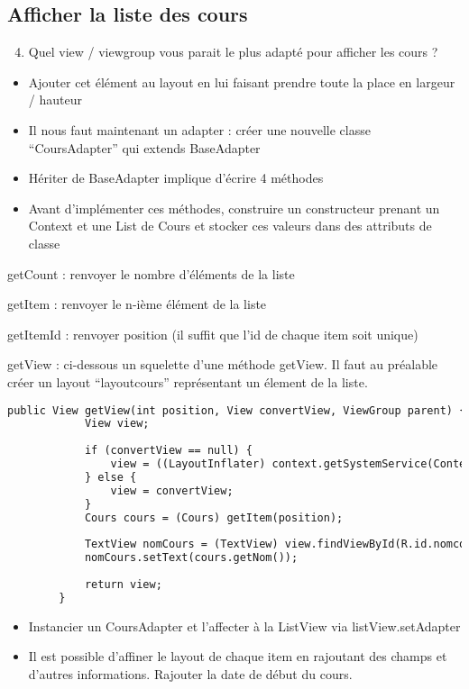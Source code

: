 \documentclass{article}
\begin{document}
\subsection{Afficher la liste des cours}
\begin{enumerate}
 \setcounter{enumi}{3}
\item Quel view / viewgroup vous parait le plus adapté pour afficher les cours ?
\end{enumerate}
\begin{itemize} 
  \item Ajouter cet élément au layout en lui faisant prendre toute la place en
  largeur / hauteur
  \item Il nous faut maintenant un adapter : créer une nouvelle classe
  ``CoursAdapter'' qui extends BaseAdapter
  \item Hériter de BaseAdapter implique d'écrire 4 méthodes
  \item Avant d'implémenter ces méthodes, construire un constructeur prenant un
  Context et une List de Cours et stocker ces valeurs dans des attributs de
  classe
 \end{itemize}
 \begin{description}
   \item getCount : renvoyer le nombre d'éléments de la liste
   \item getItem : renvoyer le n-ième élément de la liste
   \item getItemId : renvoyer position (il suffit que l'id de chaque item soit
   unique)
   \item getView : ci-dessous un squelette d'une méthode getView. Il faut au
   préalable créer un layout ``layoutcours'' représentant un élement de la
   liste.
 \end{description}
  \begin{lstlisting}[language=XML]
   public View getView(int position, View convertView, ViewGroup parent) {
			View view;
			
			if (convertView == null) {
				view = ((LayoutInflater) context.getSystemService(Context.LAYOUT_INFLATER_SERVICE)).inflate(R.layout.layoutcours, parent, false);
			} else {
				view = convertView;
			}
			Cours cours = (Cours) getItem(position);
	
			TextView nomCours = (TextView) view.findViewById(R.id.nomcours);
			nomCours.setText(cours.getNom());
			
			return view;
		}
\end{lstlisting} 

 \begin{itemize} 
  \item Instancier un CoursAdapter et l'affecter à la ListView via
  listView.setAdapter
  \item Il est possible d'affiner le layout de chaque item en rajoutant des
  champs et d'autres informations. Rajouter la date de début du cours.
\end{itemize}
\end{document}
